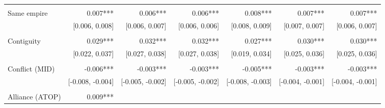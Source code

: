 \begin{table}[!h]
\begin{tabular}{lllllll}
  \multicolumn{1}{r}{} &
  \multicolumn{1}{r}{} &
  \multicolumn{1}{r}{} \\
\multicolumn{1}{l}{Same empire} &
  \multicolumn{1}{|r}{0.007***} &
  \multicolumn{1}{r}{0.006***} &
  \multicolumn{1}{r}{0.006***} &
  \multicolumn{1}{r}{0.008***} &
  \multicolumn{1}{r}{0.007***} &
  \multicolumn{1}{r}{0.007***} \\
\multicolumn{1}{l}{} &
  \multicolumn{1}{|r}{[0.006,   0.008]} &
  \multicolumn{1}{r}{[0.006,   0.007]} &
  \multicolumn{1}{r}{[0.006,   0.006]} &
  \multicolumn{1}{r}{[0.008,   0.009]} &
  \multicolumn{1}{r}{[0.007,   0.007]} &
  \multicolumn{1}{r}{[0.006,   0.007]} \\
\multicolumn{1}{l}{} &
  \multicolumn{1}{|r}{} &
  \multicolumn{1}{r}{} &
  \multicolumn{1}{r}{} &
  \multicolumn{1}{r}{} &
  \multicolumn{1}{r}{} &
  \multicolumn{1}{r}{} \\
\multicolumn{1}{l}{Contiguity} &
  \multicolumn{1}{|r}{0.029***} &
  \multicolumn{1}{r}{0.032***} &
  \multicolumn{1}{r}{0.032***} &
  \multicolumn{1}{r}{0.027***} &
  \multicolumn{1}{r}{0.030***} &
  \multicolumn{1}{r}{0.030***} \\
\multicolumn{1}{l}{} &
  \multicolumn{1}{|r}{[0.022,   0.037]} &
  \multicolumn{1}{r}{[0.027,   0.038]} &
  \multicolumn{1}{r}{[0.027,   0.038]} &
  \multicolumn{1}{r}{[0.019,   0.034]} &
  \multicolumn{1}{r}{[0.025,   0.036]} &
  \multicolumn{1}{r}{[0.025,   0.036]} \\
\multicolumn{1}{l}{} &
  \multicolumn{1}{|r}{} &
  \multicolumn{1}{r}{} &
  \multicolumn{1}{r}{} &
  \multicolumn{1}{r}{} &
  \multicolumn{1}{r}{} &
  \multicolumn{1}{r}{} \\
\multicolumn{1}{l}{Conflict (MID)} &
  \multicolumn{1}{|r}{-0.006***} &
  \multicolumn{1}{r}{-0.003***} &
  \multicolumn{1}{r}{-0.003***} &
  \multicolumn{1}{r}{-0.005***} &
  \multicolumn{1}{r}{-0.003***} &
  \multicolumn{1}{r}{-0.003***} \\
\multicolumn{1}{l}{} &
  \multicolumn{1}{|r}{[-0.008,  -0.004]} &
  \multicolumn{1}{r}{[-0.005,  -0.002]} &
  \multicolumn{1}{r}{[-0.005,  -0.002]} &
  \multicolumn{1}{r}{[-0.008,  -0.003]} &
  \multicolumn{1}{r}{[-0.004,  -0.001]} &
  \multicolumn{1}{r}{[-0.004,  -0.001]} \\
\multicolumn{1}{l}{} &
  \multicolumn{1}{|r}{} &
  \multicolumn{1}{r}{} &
  \multicolumn{1}{r}{} &
  \multicolumn{1}{r}{} &
  \multicolumn{1}{r}{} &
  \multicolumn{1}{r}{} \\
\multicolumn{1}{l}{Alliance (ATOP)} &
  \multicolumn{1}{|r}{0.009***} &

\end{tabular}
\end{table}
